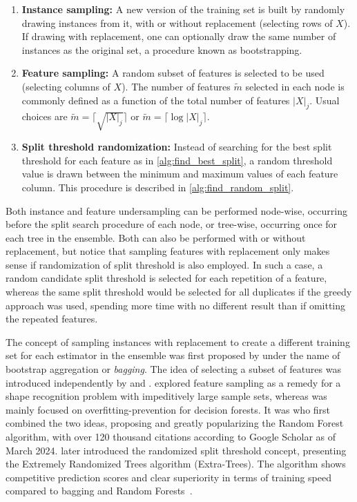 \begin{enumerate}  %
    \item \textbf{Instance sampling:} A new version of the training set is built by randomly drawing instances from it, with or without replacement (selecting rows of $X$). If drawing with replacement, one can optionally draw the same number of instances as the original set, a procedure known as bootstrapping.
    \item \textbf{Feature sampling:} A random subset of features is selected to be used (selecting columns of $X$). The number of features $\tilde m$ selected in each node is commonly defined as a function of the total number of features $|X|_j$. Usual choices are $\tilde m = \lceil \sqrt{|X|_j} \rceil$ or $\tilde m = \lceil \log |X|_j \rceil$.
    \item \textbf{Split threshold randomization:} Instead of searching for the best split threshold for each feature as in \autoref{alg:find_best_split}, a random threshold value is drawn between the minimum and maximum values of each feature column. This procedure is described in \autoref{alg:find_random_split}.  %
\end{enumerate}
%
Both instance and feature undersampling can be performed node-wise, occurring before the split search procedure of each node, or tree-wise, occurring once for each tree in the ensemble. Both can also be performed with or without replacement, but notice that sampling features with replacement only makes sense if randomization of split threshold is also employed. In such a case, a random candidate split threshold is selected for each repetition of a feature, whereas the same split threshold would be selected for all duplicates if the greedy approach was used, spending more time with no different result than if omitting the repeated features.

The concept of sampling instances with replacement to create a different training set for each estimator in the ensemble was first proposed by  under the name of bootstrap aggregation or \emph{bagging}.
%
The idea of selecting a subset of features was introduced independently by  and .  explored feature sampling as a remedy for a shape recognition problem with impeditively large sample sets, whereas  was mainly focused on overfitting-prevention for decision forests.
%
It was  who first combined the two ideas, proposing and greatly popularizing the Random Forest algorithm, with over 120 thousand citations according to Google Scholar as of March 2024.
%
 later introduced the randomized split threshold concept, presenting the Extremely Randomized Trees algorithm (Extra-Trees). The algorithm shows competitive prediction scores and clear superiority in terms of training speed compared to bagging and Random Forests~\cite{geurts2006extremely,schrynemackers2015classifying}.

